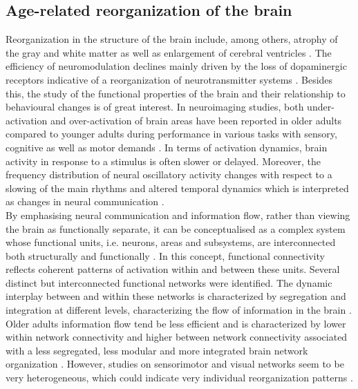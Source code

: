 \subsection{Age-related reorganization of the brain}
\label{theory:aging:brain}
Reorganization in the structure of the brain include, among others, atrophy of the gray and white matter as well as enlargement of cerebral ventricles \cite{Fjell2010}. The efficiency of neuromodulation declines mainly driven by the loss of dopaminergic receptors indicative of a reorganization of neurotransmitter systems \cite{Li2001}. Besides this, the study of the functional properties of the brain and their relationship to behavioural changes is of great interest. In neuroimaging studies, both under-activation and over-activation of brain areas have been reported in older adults compared to younger adults during performance in various tasks with sensory, cognitive as well as motor demands \cite{Reuter-Lorenz2010, Sala-Llonch2015}. In terms of activation dynamics, brain activity in response to a stimulus is often slower or delayed. Moreover, the frequency distribution of neural oscillatory activity changes with respect to a slowing of the main rhythms and altered temporal dynamics which is interpreted as changes in neural communication \cite{Courtney2021}.\\ 
By emphasising neural communication and information flow, rather than viewing the brain as functionally separate, it can be conceptualised as a complex system whose functional units, i.e. neurons, areas and subsystems, are interconnected both structurally and functionally \cite{Friston2011,Deery2023}. In this concept, functional connectivity reflects coherent patterns of activation within and between these units. Several distinct but interconnected functional networks were identified. The dynamic interplay between and within these networks is characterized by segregation and integration at different levels, characterizing the flow of information in the brain \cite{Sporns2013}. Older adults information flow tend be less efficient and is characterized by lower within network connectivity and higher between network connectivity associated with a less segregated, less modular and more integrated brain network organization \cite{Sala-Llonch2015,Deery2023, Betzel2014}. However, studies on sensorimotor and visual networks seem to be very heterogeneous, which could indicate very individual reorganization patterns \cite{Deery2023}.

